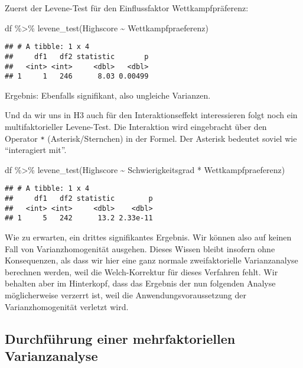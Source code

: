 \documentclass[
]{book}
\newenvironment{Shaded}{\begin{snugshade}}{\end{snugshade}}
\newcommand{\FunctionTok}[1]{\textcolor[rgb]{0.00,0.00,0.00}{#1}}
\newcommand{\NormalTok}[1]{#1}
\newcommand{\SpecialCharTok}[1]{\textcolor[rgb]{0.00,0.00,0.00}{#1}}
\begin{document}
Zuerst der Levene-Test für den Einflussfaktor Wettkampfpräferenz:

\begin{Shaded}
\begin{Highlighting}[]
\NormalTok{df }\SpecialCharTok{\%\textgreater{}\%} 
  \FunctionTok{levene\_test}\NormalTok{(Highscore }\SpecialCharTok{\textasciitilde{}}\NormalTok{ Wettkampfpraeferenz)}
\end{Highlighting}
\end{Shaded}

\begin{verbatim}
## # A tibble: 1 x 4
##     df1   df2 statistic       p
##   <int> <int>     <dbl>   <dbl>
## 1     1   246      8.03 0.00499
\end{verbatim}

Ergebnis: Ebenfalls signifikant, also ungleiche Varianzen.

Und da wir uns in H3 auch für den Interaktionseffekt interessieren folgt noch ein multifaktorieller Levene-Test. Die Interaktion wird eingebracht über den Operator \texttt{*} (Asterisk/Sternchen) in der Formel. Der Asterisk bedeutet soviel wie ``interagiert mit''.

\begin{Shaded}
\begin{Highlighting}[]
\NormalTok{df }\SpecialCharTok{\%\textgreater{}\%} 
  \FunctionTok{levene\_test}\NormalTok{(Highscore }\SpecialCharTok{\textasciitilde{}}\NormalTok{ Schwierigkeitsgrad }\SpecialCharTok{*}\NormalTok{ Wettkampfpraeferenz)}
\end{Highlighting}
\end{Shaded}

\begin{verbatim}
## # A tibble: 1 x 4
##     df1   df2 statistic        p
##   <int> <int>     <dbl>    <dbl>
## 1     5   242      13.2 2.33e-11
\end{verbatim}

Wie zu erwarten, ein drittes signifikantes Ergebnis. Wir können also auf keinen Fall von Varianzhomogenität ausgehen. Dieses Wissen bleibt insofern ohne Konsequenzen, als dass wir hier eine ganz normale zweifaktorielle Varianzanalyse berechnen werden, weil die Welch-Korrektur für dieses Verfahren fehlt. Wir behalten aber im Hinterkopf, dass das Ergebnis der nun folgenden Analyse möglicherweise verzerrt ist, weil die Anwendungsvoraussetzung der Varianzhomogenität verletzt wird.

\hypertarget{durchfuxfchrung-einer-mehrfaktoriellen-varianzanalyse}{%
\subsection{Durchführung einer mehrfaktoriellen Varianzanalyse}\label{durchfuxfchrung-einer-mehrfaktoriellen-varianzanalyse}}
\end{document}
